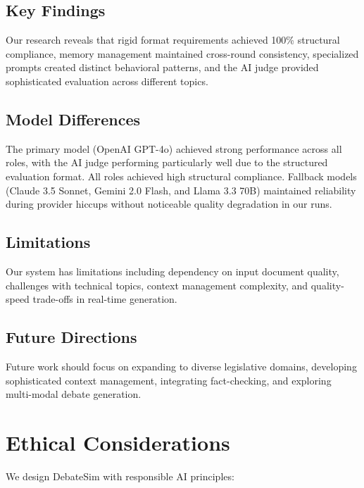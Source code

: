 \documentclass{article}
\begin{document}
\subsection{Key Findings}

Our research reveals that rigid format requirements achieved 100\% structural compliance, memory management maintained cross-round consistency, specialized prompts created distinct behavioral patterns, and the AI judge provided sophisticated evaluation across different topics.

\subsection{Model Differences}

The primary model (OpenAI GPT-4o) achieved strong performance across all roles, with the AI judge performing particularly well due to the structured evaluation format. All roles achieved high structural compliance. Fallback models (Claude 3.5 Sonnet, Gemini 2.0 Flash, and Llama 3.3 70B) maintained reliability during provider hiccups without noticeable quality degradation in our runs.

\subsection{Limitations}

Our system has limitations including dependency on input document quality, challenges with technical topics, context management complexity, and quality-speed trade-offs in real-time generation.

\subsection{Future Directions}

Future work should focus on expanding to diverse legislative domains, developing sophisticated context management, integrating fact-checking, and exploring multi-modal debate generation.

\section{Ethical Considerations}

We design DebateSim with responsible AI principles:
\end{document}
